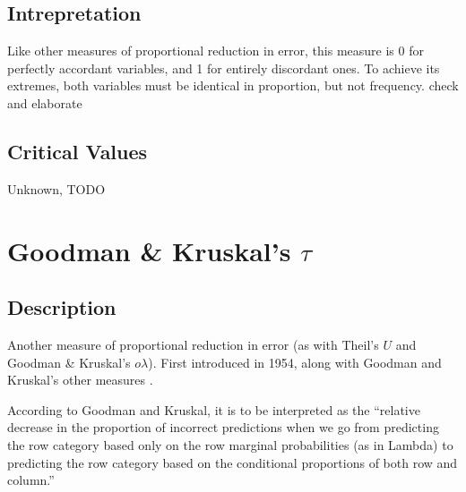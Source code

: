 \documentclass[11pt]{article}
\begin{document}

\subsection{Intrepretation}
Like other measures of proportional reduction in error, this measure is 0 for perfectly accordant variables, and 1 for entirely discordant ones.  To achieve its extremes, both variables must be identical in proportion, but not frequency. {\color{red} check and elaborate}

\subsection{Critical Values}
Unknown, TODO












\section{Goodman \& Kruskal's $\tau$}
\label{section:goodmankruskaltau}
\subsection{Description}
Another measure of proportional reduction in error (as with Theil's $U$ and Goodman \& Kruskal's $o\lambda$).  First introduced in 1954, along with Goodman and Kruskal's other measures \cite{goodman1954measures}.


According to Goodman and Kruskal, it is to be interpreted as the ``relative decrease in the proportion of incorrect predictions when we go from predicting the row category based only on the row marginal probabilities (as in Lambda) to predicting the row category based on the conditional proportions of both row and column.''
\end{document}
